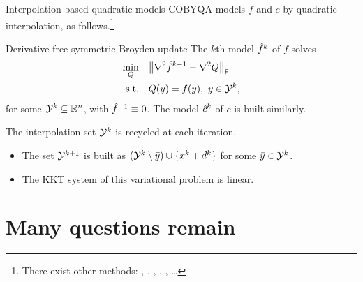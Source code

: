 \documentclass[
]{presentation}
\newcommand{\obj}{f}
\newcommand{\objm}[1][]{\hat{f}\ifblank{#1}{}{^{#1}}}
\newcommand{\con}{c}
\newcommand{\conm}[1][]{\hat{c}\ifblank{#1}{}{^{#1}}}
\newcommand{\iter}[1][]{x\ifblank{#1}{}{^{#1}}}
\newcommand{\step}[1][]{d\ifblank{#1}{}{^{#1}}}
\newcommand{\xpt}[1][]{\mathcal{Y}\ifblank{#1}{}{^{#1}}}
\begin{document}
\begin{frame}{Interpolation-based quadratic models}
    COBYQA models $\obj$ and $\con$ by \alert{quadratic} interpolation, as follows.\footnote{There exist other methods: \textcite{Conn_Scheinberg_Toint_1997a,Conn_Scheinberg_Toint_1997b,Conn_Scheinberg_Toint_1998}, \textcite{Wild_2008}, \textcite{Bandeira_Scheinberg_Vicente_2012}, \textcite{Zhang_2014}, \textcite{Xie_Yuan_2023}, \dots}

    \begin{block}{Derivative-free symmetric Broyden update \parencite{Powell_2004b}}
        The $k$th model $\objm[k]$ of $\obj$ solves
        \begin{align*}
            \min_Q          & \quad \norm[\big]{\nabla^2 \objm[k - 1] - \nabla^2 Q}_{\mathsf{F}}\\
            \textrm{s.t.}   & \quad Q(y) = \obj(y), ~ y \in \xpt[k],
        \end{align*}
        for some $\xpt[k] \subseteq \R^n$, with $\objm[-1] \equiv 0$.
        The model $\conm[k]$ of $\con$ is built similarly.
    \end{block}

    The interpolation set $\xpt[k]$ is \alert{recycled} at each iteration.
    \begin{itemize}
        \item The set $\xpt[k + 1]$ is built as $(\xpt[k] \setminus {\bar{y}}) \cup \set{\iter[k] + \step[k]}$ for some $\bar{y} \in \xpt[k]$.
        \item The KKT system of this variational problem is \alert{linear}.
    \end{itemize}
\end{frame}

\section{Many questions remain}
\end{document}
